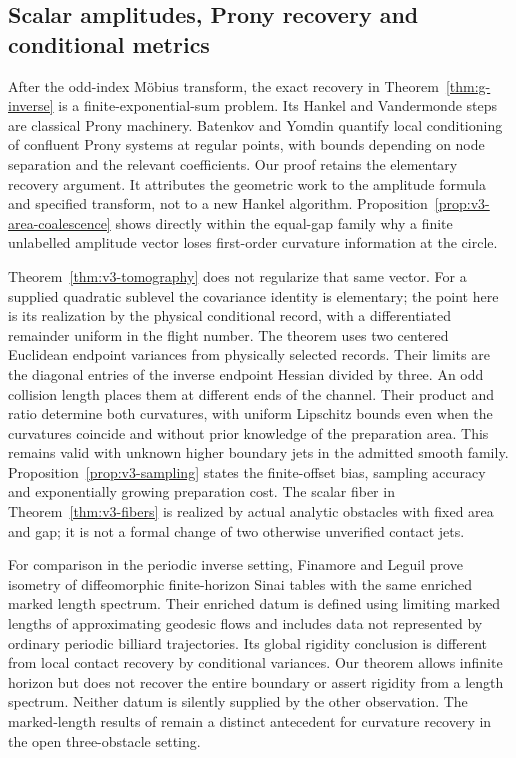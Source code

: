 \subsection{Scalar amplitudes, Prony recovery and conditional metrics}
After the odd-index M\"obius transform, the exact recovery in
Theorem~\ref{thm:g-inverse} is a finite-exponential-sum problem.
Its Hankel and Vandermonde steps are classical Prony machinery.
Batenkov and Yomdin \cite[Theorem 4.5]{BYProny} quantify local
conditioning of confluent Prony systems at regular points, with
bounds depending on node separation and the relevant coefficients.
Our proof retains the elementary recovery argument. It attributes
the geometric work to the amplitude formula and specified transform,
not to a new Hankel algorithm. Proposition~\ref{prop:v3-area-coalescence}
shows directly within the equal-gap family why a finite unlabelled
amplitude vector loses first-order curvature information at the circle.

Theorem~\ref{thm:v3-tomography} does not regularize that same vector.
For a supplied quadratic sublevel the covariance identity is elementary;
the point here is its realization by the physical conditional record,
with a differentiated remainder uniform in the flight number.
The theorem uses two centered Euclidean endpoint variances from
physically selected records. Their limits are the diagonal entries of the inverse
endpoint Hessian divided by three. An odd collision length places them
at different ends of the channel. Their product and ratio determine
both curvatures, with uniform Lipschitz bounds even when the curvatures
coincide and without prior knowledge of the preparation area. This
remains valid with unknown higher boundary jets in the admitted smooth
family. Proposition~\ref{prop:v3-sampling} states the finite-offset
bias, sampling accuracy and exponentially growing preparation cost.
The scalar fiber in Theorem~\ref{thm:v3-fibers} is realized by actual
analytic obstacles with fixed area and gap; it is not a formal change
of two otherwise unverified contact jets.

For comparison in the periodic inverse setting, Finamore and Leguil
\cite[Theorem A]{FinamoreLeguil} prove isometry of diffeomorphic
finite-horizon Sinai tables with the same enriched marked length
spectrum. Their enriched datum is defined using limiting marked lengths
of approximating geodesic flows and includes data not represented by
ordinary periodic billiard trajectories. Its global rigidity conclusion
is different from local contact recovery by conditional variances.
Our theorem allows infinite horizon but does not recover the entire
boundary or assert rigidity from a length spectrum. Neither datum is
silently supplied by the other observation. The marked-length results
of \cite{BDKL} remain a distinct antecedent for curvature recovery in
the open three-obstacle setting.


